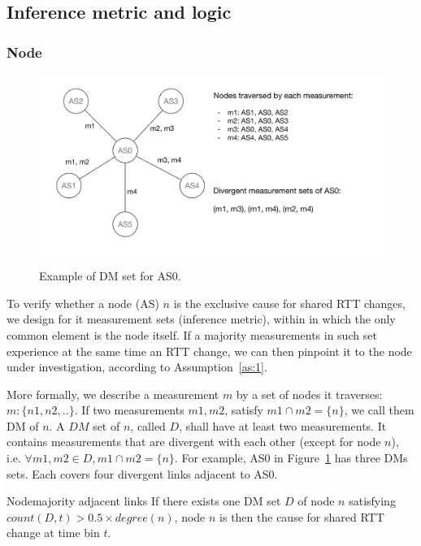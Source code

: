 \subsection{Inference metric and logic}
\subsubsection{Node}
\begin{figure}[!htb]
\centering
\includegraphics[width=1\textwidth]{gfx/chap5/dms.pdf}
\caption{Example of \acf{DM} set for AS0.}
\label{fig:chap5_dms}
\end{figure}

To verify whether a node (AS) $n$ is the exclusive cause for shared RTT changes, we
design for it measurement sets (inference metric), within in which the only common element is the node itself. If a majority measurements in such set experience at the same time an RTT change, we can then pinpoint it to the node under investigation, according to Assumption~\ref{as:1}.

More formally, we describe a measurement $m$ by a set of nodes it traverses: $m:\{n1, n2,..\}$. 
If two measurements $m1, m2$, satisfy $m1 \cap m2 = \{n\}$, we call them \acf{DM} of $n$.
A $DM$ set of $n$, called $D$, shall have at least two measurements. It contains measurements that are divergent with each other (except for node $n$), i.e. $\forall m1, m2 \in D, m1 \cap m2 = \{n\}$.
For example, AS0 in Figure~\ref{fig:chap5_dms} has three \acp{DM} sets. Each covers four divergent links adjacent to AS0.

\begin{heuristic}{Node}{majority adjacent links}\label{hu:node}
If there exists one \ac{DM} set $D$ of node $n$ satisfying $count(D, t) > 0.5 \times degree(n)$,  node $n$ is then the cause for shared RTT change at time bin $t$. 
\end{heuristic}

